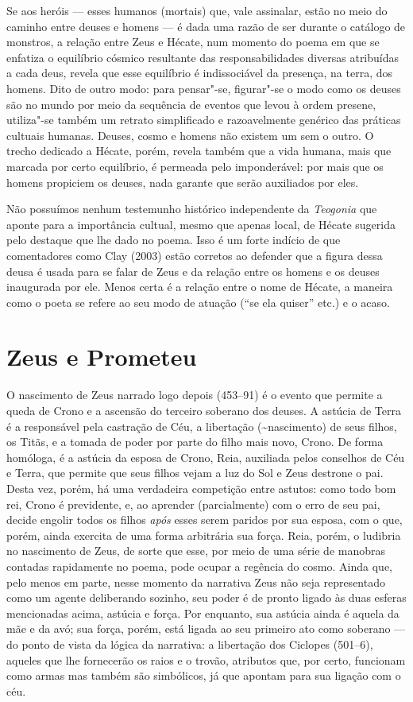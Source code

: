 Se aos heróis --- esses humanos (mortais) que, vale assinalar, estão no
meio do caminho entre deuses e homens --- é dada uma razão de ser durante
o catálogo de monstros, a relação entre Zeus e Hécate, num momento do
poema em que se enfatiza o equilíbrio cósmico resultante das
responsabilidades diversas atribuídas a cada deus, revela que esse
equilíbrio é indissociável da presença, na terra, dos homens. Dito de
outro modo: para pensar"-se, figurar"-se o modo como os deuses são no
mundo por meio da sequência de eventos que levou à ordem presene,
utiliza"-se também um retrato simplificado e razoavelmente genérico das
práticas cultuais humanas. Deuses, cosmo e homens não existem um sem o
outro. O trecho dedicado a Hécate, porém, revela também que a vida
humana, mais que marcada por certo equilíbrio, é permeada pelo
imponderável: por mais que os homens propiciem os deuses, nada garante
que serão auxiliados por eles.

Não possuímos nenhum testemunho histórico independente da
\emph{Teogonia} que aponte para a importância cultual, mesmo que apenas
local, de Hécate sugerida pelo destaque que lhe dado no poema. Isso é um
forte indício de que comentadores como Clay (2003) estão corretos ao
defender que a figura dessa deusa é usada para se falar de Zeus e da
relação entre os homens e os deuses inaugurada por ele. Menos certa é a
relação entre o nome de Hécate, a maneira como o poeta se refere ao seu
modo de atuação (``se ela quiser'' etc.) e o acaso.

\section{Zeus e Prometeu}

O nascimento de Zeus narrado logo depois (453--91) é o evento que permite
a queda de Crono e a ascensão do terceiro soberano dos deuses. A astúcia
de Terra é a responsável pela castração de Céu, a libertação
(\textasciitilde{}nascimento) de seus filhos, os Titãs, e a tomada de
poder por parte do filho mais novo, Crono. De forma homóloga, é a
astúcia da esposa de Crono, Reia, auxiliada pelos conselhos de Céu e
Terra, que permite que seus filhos vejam a luz do Sol e Zeus destrone o
pai. Desta vez, porém, há uma verdadeira competição entre astutos: como
todo bom rei, Crono é previdente, e, ao aprender (parcialmente) com o
erro de seu pai, decide engolir todos os filhos \emph{após} esses serem
paridos por sua esposa, com o que, porém, ainda exercita de uma forma
arbitrária sua força. Reia, porém, o ludibria no nascimento de Zeus, de
sorte que esse, por meio de uma série de manobras contadas rapidamente
no poema, pode ocupar a regência do cosmo. Ainda que, pelo menos em
parte, nesse momento da narrativa Zeus não seja representado como um
agente deliberando sozinho, seu poder é de pronto ligado às duas esferas
mencionadas acima, astúcia e força. Por enquanto, sua astúcia ainda é
aquela da mãe e da avó; sua força, porém, está ligada ao seu primeiro
ato como soberano --- do ponto de vista da lógica da narrativa: a
libertação dos Ciclopes (501--6), aqueles que lhe fornecerão os raios e o
trovão, atributos que, por certo, funcionam como armas mas também são
simbólicos, já que apontam para sua ligação com o céu.

